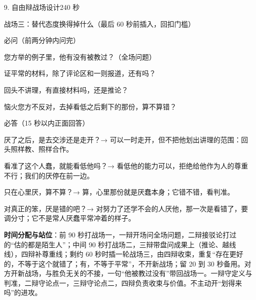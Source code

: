 \documentclass[script,con]{debate}
\begin{document}
\begin{stage}{9. 自由辩战场设计}{240 秒}
\begin{battleground}{战场三：替代态度换得掉什么（最后 60 秒前插入，回扣门槛）}
\begin{fields}
\end{fields}
\end{battleground}
\begin{points}{必问（前两分钟内问完）}
\item 您方举的例子里，他有没有被教过？（全场问题）
\item 证平常的材料，除了评论区和一则报道，还有吗？
\item 回头不讲理，有直接材料吗，还是推论？
\item 恼火您方不反对，去掉看低之后剩下的那份，算不算错？
\end{points}
\begin{points}{必答（15 秒以内正面回答）}
\item 厌了之后，是去交涉还是走开？→ 可以一时走开，但不把他划出讲理的范围：回头照样教、照样合作。
\item 看准了这个人蠢，就能看低他吗？→ 看低他的能力可以，拒绝给他作为人的尊重不行；我们的厌停在前一边。
\item 只在心里厌，算不算？→ 算，心里那份就是厌蠢本身；它错不错，看判准。
\item 对真正的笨，厌是错的吧？→ 对努力了还学不会的人厌他，那一次是看错了，要调分寸；它不是常人厌蠢平常冲着的样子。
\end{points}
\textbf{时间分配与站位}：前 90 秒打战场一，一辩开场问全场问题，二辩接驳论打过的“估的都是陌生人”；中间 90 秒打战场二，三辩带盘问成果上（推论、越线线），四辩补尊重线；剩约 60 秒时插一轮战场三，由四辩收束，重复“存在更好的，不等于这个就错了；有，不等于平常”，不开新战场；留 20 到 30 秒备用。对方开新战场，与胜负无关的不接，一句“他被教过没有”带回战场一。一辩守定义与判准，二辩守论点一，三辩守论点二，四辩负责收束与价值。不主动开“划得来吗”的进攻。
\end{stage}
\end{document}
